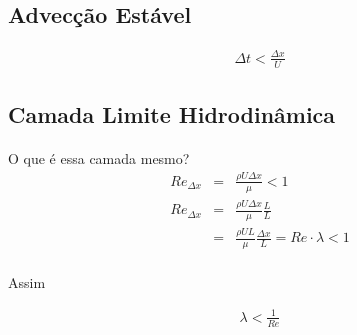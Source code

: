 \documentclass[fisica.tex]{subfiles}
\begin{document}
\subsection{Advecção Estável}
\begin{eqnarray}
\Delta t < \frac{\Delta x}{U}
\end{eqnarray}

\subsection{Camada Limite Hidrodinâmica}
\paragraph{} O que é essa camada mesmo?
\begin{eqnarray*}
\mathit{Re}_{\Delta x} &=& \frac{\rho U \Delta x}{\mu} < 1\\
\mathit{Re}_{\Delta x} &=& \frac{\rho U \Delta x}{\mu} \frac{L}{L}\\
&=& \frac{\rho U L}{\mu} \frac{\Delta x}{L}=\mathit{Re}\cdot \lambda < 1
\end{eqnarray*}

\paragraph{} Assim

\begin{eqnarray}
\lambda < \frac{1}{\mathit{Re}}
\end{eqnarray}
\end{document}
